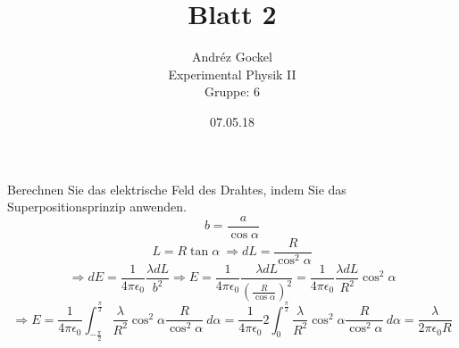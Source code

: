 \documentclass[12pt]{article}
\newcommand{\kq}{\frac{1}{4 \pi \epsilon_0}}
\newenvironment{exercise}[2][Aufgabe]{\begin{trivlist}
\item[\hskip \labelsep {\bfseries #1}\hskip \labelsep {\bfseries #2.}]}{\end{trivlist}}
\begin{document}
 
\title{Blatt 2}
\author{Andréz Gockel\\ 
Experimental Physik II\\
Gruppe: 6}
 
\date{07.05.18}
\maketitle


\begin{exercise}{1a}
Berechnen Sie das elektrische Feld des Drahtes, indem Sie das Superpositionsprinzip anwenden.\\
%
%
%
%
$$b = \frac{a}{\cos \alpha}$$
$$L = R \tan \alpha \ \Rightarrow dL = \frac{R}{\cos^2 \alpha}$$
$$\Rightarrow dE=\kq \frac{\lambda dL}{b^2} \Rightarrow E = \kq \frac{\lambda dL}{(\frac{R}{\cos \alpha})^2} = \kq \frac{\lambda dL}{R^2}\cos^2 \alpha$$
$$\Rightarrow E = \kq \int_{-\frac{\pi}{2	}}^{\frac{\pi}{2	}}\frac{\lambda}{R^2} \cos^2 \alpha \frac{R}{\cos^2 \alpha} \ d\alpha = \kq 2 \int_{0}^{\frac{\pi}{2}}\frac{\lambda}{R^2} \cos^2 \alpha \frac{R}{\cos^2 \alpha} \ d\alpha = \frac{\lambda}{2 \pi \epsilon_0 R}$$
\end{exercise}
\pagebreak
\end{document}

